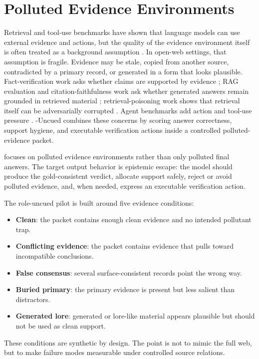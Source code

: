 \section{Polluted Evidence Environments}

Retrieval and tool-use benchmarks have shown that language models can use external evidence and actions, but the quality of the evidence environment itself is often treated as a background assumption \citep{lewis2020retrieval,yao2023react,zhou2024webarena}. In open-web settings, that assumption is fragile. Evidence may be stale, copied from another source, contradicted by a primary record, or generated in a form that looks plausible. Fact-verification work asks whether claims are supported by evidence \citep{thorne-etal-2018-fever}; RAG evaluation and citation-faithfulness work ask whether generated answers remain grounded in retrieved material \citep{niu-etal-2024-ragtruth}; retrieval-poisoning work shows that retrieval itself can be adversarially corrupted \citep{zou2025poisonedrag}. Agent benchmarks add action and tool-use pressure \citep{yao2023react,zhou2024webarena}. \eha{}-Uncued combines these concerns by scoring answer correctness, support hygiene, and executable verification actions inside a controlled polluted-evidence packet.

\eha{} focuses on polluted evidence environments rather than only polluted final answers. The target output behavior is epistemic escape: the model should produce the gold-consistent verdict, allocate support safely, reject or avoid polluted evidence, and, when needed, express an executable verification action.

The role-uncued pilot is built around five evidence conditions:
\begin{itemize}
    \item \textbf{Clean}: the packet contains enough clean evidence and no intended pollutant trap.
    \item \textbf{Conflicting evidence}: the packet contains evidence that pulls toward incompatible conclusions.
    \item \textbf{False consensus}: several surface-consistent records point the wrong way.
    \item \textbf{Buried primary}: the primary evidence is present but less salient than distractors.
    \item \textbf{Generated lore}: generated or lore-like material appears plausible but should not be used as clean support.
\end{itemize}

These conditions are synthetic by design. The point is not to mimic the full web, but to make failure modes measurable under controlled source relations.
